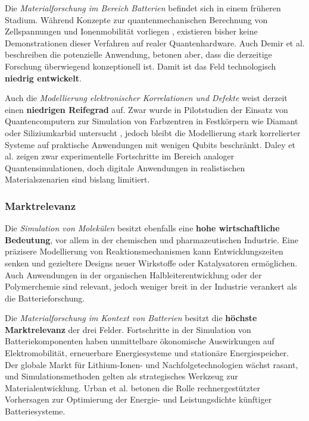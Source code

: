 \vspace{0.5em}

Die \textit{Materialforschung im Bereich Batterien} befindet sich in einem früheren Stadium. Während Konzepte zur quantenmechanischen Berechnung von Zellspannungen und Ionenmobilität vorliegen \cite{urban_computational_2016}, existieren bisher keine Demonstrationen dieser Verfahren auf realer Quantenhardware. Auch Demir et al. beschreiben die potenzielle Anwendung, betonen aber, dass die derzeitige Forschung überwiegend konzeptionell ist. \cite{demirApplicationQuantumComputing2024} Damit ist das Feld technologisch \textbf{niedrig entwickelt}.

\vspace{0.5em}

Auch die \textit{Modellierung elektronischer Korrelationen und Defekte} weist derzeit einen \textbf{niedrigen Reifegrad} auf. Zwar wurde in Pilotstudien der Einsatz von Quantencomputern zur Simulation von Farbzentren in Festkörpern wie Diamant oder Siliziumkarbid untersucht \cite{cao_ab_2023}, jedoch bleibt die Modellierung stark korrelierter Systeme auf praktische Anwendungen mit wenigen Qubits beschränkt. Daley et al. zeigen zwar experimentelle Fortschritte im Bereich analoger Quantensimulationen, doch digitale Anwendungen in realistischen Materialszenarien sind bislang limitiert. \cite{daley_practical_2022}


\subsubsection{Marktrelevanz}

Die \textit{Simulation von Molekülen} besitzt ebenfalls eine \textbf{hohe wirtschaftliche Bedeutung}, vor allem in der chemischen und pharmazeutischen Industrie. Eine präzisere Modellierung von Reaktionsmechanismen kann Entwicklungszeiten senken und gezieltere Designs neuer Wirkstoffe oder Katalysatoren ermöglichen. \cite{mcardle_quantum_2020} Auch Anwendungen in der organischen Halbleiterentwicklung oder der Polymerchemie sind relevant, jedoch weniger breit in der Industrie verankert als die Batterieforschung.

\vspace{0.5em}

Die \textit{Materialforschung im Kontext von Batterien} besitzt die \textbf{höchste Marktrelevanz} der drei Felder. Fortschritte in der Simulation von Batteriekomponenten haben unmittelbare ökonomische Auswirkungen auf Elektromobilität, erneuerbare Energiesysteme und stationäre Energiespeicher. Der globale Markt für Lithium-Ionen- und Nachfolgetechnologien wächst rasant, und Simulationsmethoden gelten als strategisches Werkzeug zur Materialentwicklung. \cite{demirApplicationQuantumComputing2024} Urban et al. betonen die Rolle rechnergestützter Vorhersagen zur Optimierung der Energie- und Leistungsdichte künftiger Batteriesysteme. \cite{urban_computational_2016}

